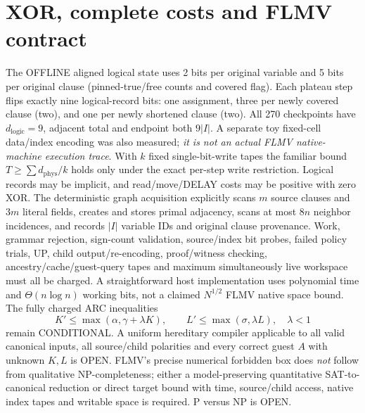\documentclass[11pt]{article}
\begin{document}
\section{XOR, complete costs and FLMV contract}
The OFFLINE aligned logical state uses 2 bits per original variable and 5 bits per original clause (pinned-true/free counts and covered flag). Each plateau step flips exactly nine logical-record bits: one assignment, three per newly covered clause (two), and one per newly shortened clause (two). All 270 checkpoints have $d_{\mathrm{logic}}=9$, adjacent total and endpoint both $9|I|$. A separate toy fixed-cell data/index encoding was also measured; \emph{it is not an actual FLMV native-machine execution trace}. With $k$ fixed single-bit-write tapes the familiar bound $T\ge\sum d_{\mathrm{phys}}/k$ holds only under the exact per-step write restriction. Logical records may be implicit, and read/move/DELAY costs may be positive with zero XOR.
The deterministic graph acquisition explicitly scans $m$ source clauses and $3m$ literal fields, creates and stores primal adjacency, scans at most $8n$ neighbor incidences, and records $|I|$ variable IDs and original clause provenance. Work, grammar rejection, sign-count validation, source/index bit probes, failed policy trials, UP, child output/re-encoding, proof/witness checking, ancestry/cache/guest-query tapes and maximum simultaneously live workspace must all be charged. A straightforward host implementation uses polynomial time and $\Theta(n\log n)$ working bits, not a claimed $N^{1/2}$ FLMV native space bound. The fully charged ARC inequalities
\[
K'\le\max(\alpha,\gamma+\lambda K),\qquad
L'\le\max(\sigma,\lambda L),\quad\lambda<1
\]
remain CONDITIONAL. A uniform hereditary compiler applicable to all valid canonical inputs, all source/child polarities and every correct guest $A$ with unknown $K,L$ is OPEN. FLMV's precise numerical forbidden box does \emph{not} follow from qualitative NP-completeness; either a model-preserving quantitative SAT-to-canonical reduction or direct target bound with time, source/child access, native index tapes and writable space is required. P versus NP is OPEN.
\end{document}
